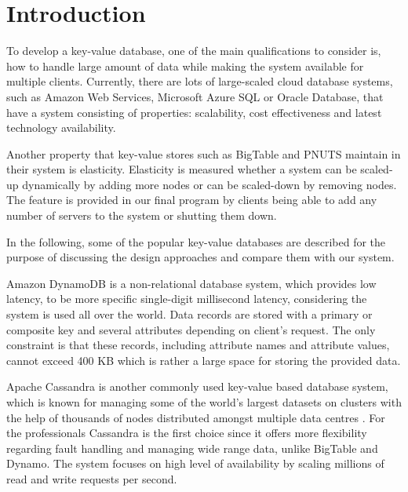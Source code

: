 \section{Introduction}
\label{sec:introduction}

To develop a key-value database, one of the main qualifications to consider is, how to handle large amount of data while making the system available for multiple clients. Currently, there are lots of large-scaled cloud database systems, such as Amazon Web Services, Microsoft Azure SQL or Oracle Database, that have a system consisting of properties: scalability, cost effectiveness and latest technology availability. 

Another property that key-value stores such as BigTable and PNUTS maintain in their system is elasticity. Elasticity is measured whether a system can be scaled-up dynamically by adding more nodes or can be scaled-down by removing nodes\cite{agrawal2011database}. The feature is provided in our final program by clients being able to add any number of servers to the system or shutting them down.

In the following, some of the popular key-value databases are described for the purpose of discussing the design approaches and compare them with our system.

Amazon DynamoDB is a non-relational database system, which provides low latency, to be more specific single-digit millisecond latency\cite{amazon}, considering the system is used all over the world. Data records are stored with a primary or composite key and several attributes depending on client's request\cite{kalid2017big}. The only constraint is that these records, including attribute names and attribute values, cannot exceed 400 KB which is rather a large space for storing the provided data\cite{amazon}.

Apache Cassandra is another commonly used key-value based database system, which is known for managing some of the world's largest datasets on clusters with the help of thousands of nodes distributed amongst multiple data centres \cite{chebotko2015big}. For the professionals Cassandra is the first choice since it offers more flexibility regarding fault handling and managing wide range data, unlike BigTable and Dynamo\cite{kalid2017big}. The system focuses on high level of availability by scaling millions of read and write requests per second\cite{chebotko2015big}.

